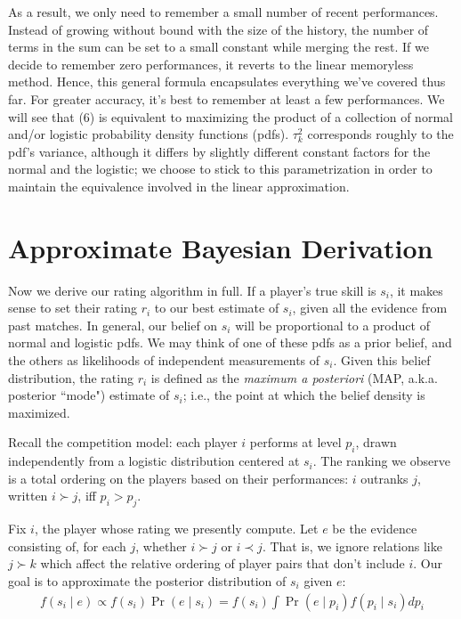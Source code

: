 \documentclass{article}
\begin{document}
As a result, we only need to remember a small number of recent performances. Instead of growing without bound with the size of the history, the number of terms in the sum can be set to a small constant while merging the rest. If we decide to remember zero performances, it reverts to the linear memoryless method. Hence, this general formula encapsulates everything we've covered thus far. For greater accuracy, it's best to remember at least a few performances. We will see that (6) is equivalent to maximizing the product of a collection of normal and/or logistic probability density functions (pdfs). $\tau_k^2$ corresponds roughly to the pdf's variance, although it differs by slightly different constant factors for the normal and the logistic; we choose to stick to this parametrization in order to maintain the equivalence involved in the linear approximation.

\section{Approximate Bayesian Derivation}

Now we derive our rating algorithm in full. If a player's true skill is $s_i$, it makes sense to set their rating $r_i$ to our best estimate of $s_i$, given all the evidence from past matches. In general, our belief on $s_i$ will be proportional to a product of normal and logistic pdfs. We may think of one of these pdfs as a prior belief, and the others as likelihoods of independent measurements of $s_i$. Given this belief distribution, the rating $r_i$ is defined as the \emph{maximum a posteriori} (MAP, a.k.a. posterior ``mode") estimate of $s_i$; i.e., the point at which the belief density is maximized.

Recall the competition model: each player $i$ performs at level $p_i$, drawn independently from a logistic distribution centered at $s_i$. The ranking we observe is a total ordering on the players based on their performances: $i$ outranks $j$, written $i \succ j$, iff $p_i > p_j$.

Fix $i$, the player whose rating we presently compute. Let $e$ be the evidence consisting of, for each $j$, whether $i \succ j$ or $i \prec j$. That is, we ignore relations like $j \succ k$ which affect the relative ordering of player pairs that don't include $i$. Our goal is to approximate the posterior distribution of $s_i$ given $e$:
\begin{align}
f(s_i\mid e) \propto f(s_i)\Pr(e\mid s_i) = f(s_i)\int \Pr(e\mid p_i)f(p_i\mid s_i)dp_i
\end{align}
\end{document}
